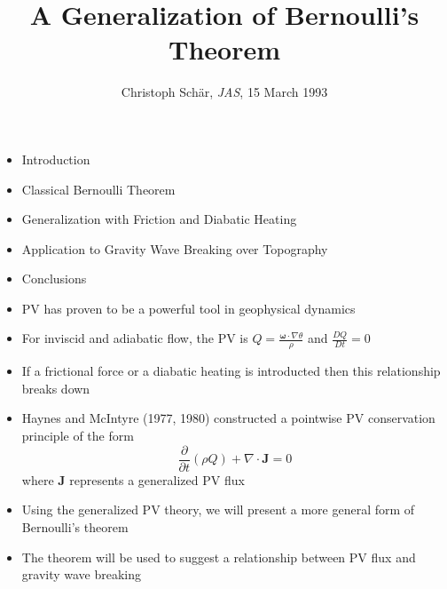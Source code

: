 \documentclass[30pt,landscape]{foils}
\title{A Generalization of Bernoulli's Theorem}
\author{Christoph Sch\"ar, \emph{JAS}, 15 March 1993}
\date{}
\newcommand{\pdiff}[2]{\frac{\partial #1}{\partial #2}}
\begin{document}
\maketitle

\hypersetup{pdfpagetransition=Replace}

\begin{itemize}
  \item Introduction

  \item Classical Bernoulli Theorem

  \item Generalization with Friction and Diabatic Heating

  \item Application to Gravity Wave Breaking over Topography

  \item Conclusions

\end{itemize}

\hypersetup{pdfpagetransition=Replace}

\begin{itemize}
  \item PV has proven to be a powerful tool in geophysical dynamics

  \item For inviscid and adiabatic flow, the PV is $Q = \frac{\bm{\omega} \cdot \nabla \theta}{\rho}$ and $\frac{D Q}{D t} = 0$

  \item If a frictional force or a diabatic heating is introducted then this relationship breaks down

  \item Haynes and McIntyre (1977, 1980) constructed a pointwise PV conservation principle of the form
  \begin{equation*}
  \pdiff{}{t} \left(\rho Q\right) + \nabla \cdot \bm{J} = 0
  \end{equation*}
      where $\bm{J}$ represents a generalized PV flux

  \item Using the generalized PV theory, we will present a more general form of Bernoulli's theorem

  \item The theorem will be used to suggest a relationship between PV flux and gravity wave breaking

\end{itemize}
\end{document}
